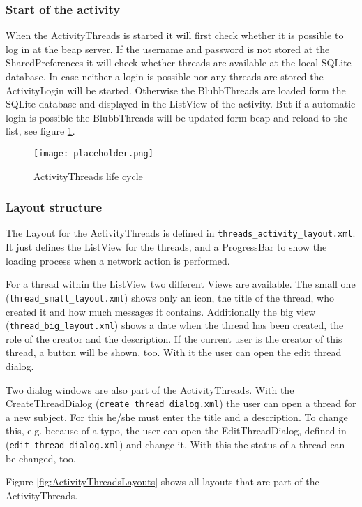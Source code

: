\documentclass[12pt,a4paper,oneside]{report}
\newcommand{\beapServer}{beap server}
\newcommand{\code}[1]{\lstinline{#1}}
\begin{document}
\subsubsection{Start of the activity}
When the ActivityThreads is started it will first check whether it is possible to log in at the \beapServer{}. If the username and password is not stored at the SharedPreferences it will check whether threads are available at the local SQLite database. In case neither a login is possible nor any threads are stored the ActivityLogin will be started. Otherwise the BlubbThreads are loaded form the SQLite database and displayed in the ListView of the activity. But if a automatic login is possible the BlubbThreads will be updated form beap and reload to the list, see figure \ref{fig:ActivityThreadsLC}.

\begin{figure}[!ht]
    \texttt{[image: placeholder.png]}
	\caption{ActivityThreads life cycle} 
	\label{fig:ActivityThreadsLC}
\end{figure}

\subsubsection{Layout structure}
The Layout for the ActivityThreads is defined in \code{threads_activity_layout.xml}.
It just defines the ListView for the threads, and a ProgressBar to show the loading process when a network action is performed. 

For a thread within the ListView two different Views are available. The small one (\code{thread_small_layout.xml}) shows only an icon, the title of the thread, who created it and how much messages it contains. Additionally the big view (\code{thread_big_layout.xml}) shows a date when the thread has been created, the role of the creator and the description. If the current user is the creator of this thread, a button will be shown, too. With it the user can open the edit thread dialog. 


Two dialog windows are also part of the ActivityThreads. With the CreateThreadDialog (\code{create_thread_dialog.xml}) the user can open a thread for a new subject. For this he/she must enter the title and a description. To change this, e.g. because of a typo, the user can open the EditThreadDialog, defined in (\code{edit_thread_dialog.xml}) and change it. With this the status of a thread can be changed, too.

Figure \ref{fig:ActivityThreadsLayouts} shows all layouts that are part of the ActivityThreads.
\end{document}
